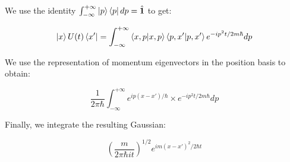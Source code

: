 
We use the identity $\int_{-\infty}^{+\infty} \ket{p}\bra{p} dp = \hat{\textbf{1}}$ to get:

\begin{equation}
   \ket{x} U(t) \bra{x'} = \int_{-\infty}^{+\infty} \braket{x,p}\braket{p,x'} e^{-ip^2t/2m\hbar} dp
\end{equation}

We use the representation of momentum eigenvectors in the position basis to obtain:

\begin{equation}
   \frac{1}{2 \pi \hbar} \int_{-\infty}^{+\infty} e^{ip(x-x')/\hbar} \times e^{-ip^2t/2m\hbar} dp
\end{equation}

Finally, we integrate the resulting Gaussian:

\begin{equation}
   (\frac{m}{2 \pi \hbar i t})^{1/2} e^{im(x-x')^2/2 \hbar t}
\end{equation}
